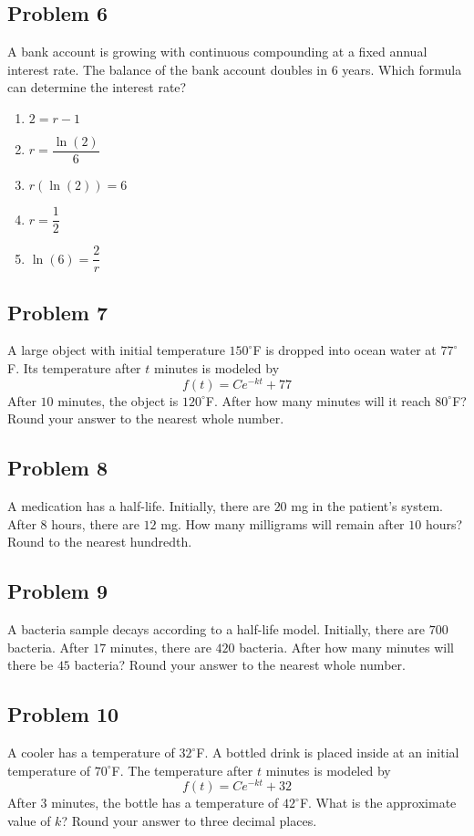 \documentclass[12pt]{article}
\begin{document}
\subsection*{Problem 6}
A bank account is growing with continuous compounding at a fixed annual interest rate. The balance of the bank account doubles in \(6\) years. Which formula can determine the interest rate?
\begin{enumerate}[label=(\alph*)]
    \item \(2=r-1\)
    \item \(r=\dfrac{\ln(2)}{6}\)
    \item \(r(\ln(2))=6\)
    \item \(r=\dfrac{1}{2}\)
    \item \(\ln(6)=\dfrac{2}{r}\)
\end{enumerate}

\subsection*{Problem 7}
A large object with initial temperature \(150^\circ\)F is dropped into ocean water at \(77^\circ\)F. Its temperature after \(t\) minutes is modeled by
\[
f(t)=Ce^{-kt}+77
\]
After \(10\) minutes, the object is \(120^\circ\)F. After how many minutes will it reach \(80^\circ\)F? Round your answer to the nearest whole number.

\subsection*{Problem 8}
A medication has a half-life. Initially, there are \(20\) mg in the patient's system. After \(8\) hours, there are \(12\) mg. How many milligrams will remain after \(10\) hours? Round to the nearest hundredth.

\subsection*{Problem 9}
A bacteria sample decays according to a half-life model. Initially, there are \(700\) bacteria. After \(17\) minutes, there are \(420\) bacteria. After how many minutes will there be \(45\) bacteria? Round your answer to the nearest whole number.

\subsection*{Problem 10}
A cooler has a temperature of \(32^\circ\)F. A bottled drink is placed inside at an initial temperature of \(70^\circ\)F. The temperature after \(t\) minutes is modeled by
\[
f(t)=Ce^{-kt}+32
\]
After \(3\) minutes, the bottle has a temperature of \(42^\circ\)F. What is the approximate value of \(k\)? Round your answer to three decimal places.
\end{document}

